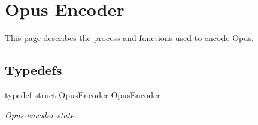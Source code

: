\hypertarget{group__opus__encoder}{}\section{Opus Encoder}
\label{group__opus__encoder}


This page describes the process and functions used to encode Opus.  


\subsection*{Typedefs}
\begin{DoxyCompactItemize}
\item 
typedef struct \hyperlink{group__opus__encoder_gaf461a3ef2f10c2fe8b994a176f06c9bd}{Opus\+Encoder} \hyperlink{group__opus__encoder_gaf461a3ef2f10c2fe8b994a176f06c9bd}{Opus\+Encoder}
\begin{DoxyCompactList}\small\item\em Opus encoder state. \end{DoxyCompactList}\end{DoxyCompactItemize}
